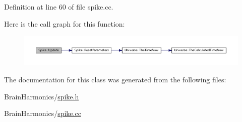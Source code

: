 Definition at line 60 of file spike.\+cc.

Here is the call graph for this function\+:\nopagebreak
\begin{figure}[H]
\begin{center}
\leavevmode
\includegraphics[width=350pt]{class_spike_a683a0ca5e62e68777381fc85f4bf3019_cgraph}
\end{center}
\end{figure}


The documentation for this class was generated from the following files\+:\begin{DoxyCompactItemize}
\item 
Brain\+Harmonics/\mbox{\hyperlink{spike_8h}{spike.\+h}}\item 
Brain\+Harmonics/\mbox{\hyperlink{spike_8cc}{spike.\+cc}}\end{DoxyCompactItemize}
